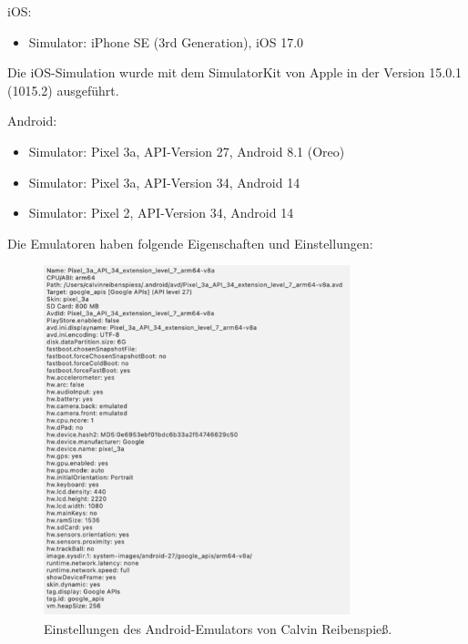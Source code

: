 iOS:

\begin{itemize}
  \item Simulator: iPhone SE (3rd Generation), iOS 17.0
\end{itemize}

Die iOS-Simulation wurde mit dem SimulatorKit von Apple in der Version 15.0.1 (1015.2) ausgeführt.

Android:

\begin{itemize}
  \item Simulator: Pixel 3a, API-Version 27, Android 8.1 (Oreo)
  \item Simulator: Pixel 3a, API-Version 34, Android 14
  \item Simulator: Pixel 2, API-Version 34, Android 14
\end{itemize}

Die Emulatoren haben folgende Eigenschaften und Einstellungen:

\begin{figure}[H]
    \centering
    \includegraphics[width=0.8\textwidth]{images/android_emulator_reibenspiess.png}
    \caption{Einstellungen des Android-Emulators von Calvin Reibenspieß.}
    \label{branding}
\end{figure}

